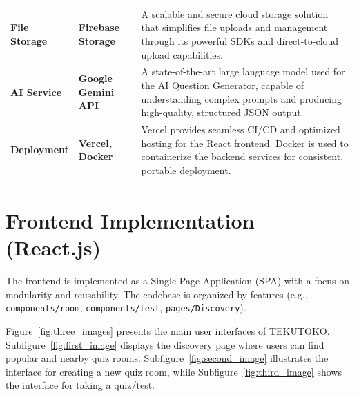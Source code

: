 \begin{longtable}{
>{\raggedright\arraybackslash}p{2.8cm} 
>{\centering\arraybackslash}p{3.2cm} 
>{\raggedright\arraybackslash}p{8cm}}
\textbf{File Storage} & \textbf{Firebase Storage} &
A scalable and secure cloud storage solution that simplifies file uploads and management through its powerful SDKs and direct-to-cloud upload capabilities. \\[0.5em]

\textbf{AI Service} & \textbf{Google Gemini API} &
A state-of-the-art large language model used for the AI Question Generator, capable of understanding complex prompts and producing high-quality, structured JSON output. \\[0.5em]

\textbf{Deployment} & \textbf{Vercel, Docker} &
Vercel provides seamless CI/CD and optimized hosting for the React frontend.
Docker is used to containerize the backend services for consistent, portable deployment. \\[0.5em]

\end{longtable}



\section{Frontend Implementation (React.js)}
\label{sec:impl-frontend}

The frontend is implemented as a Single-Page Application (SPA) with a focus on modularity and reusability. The codebase is organized by features (e.g., \texttt{components/room}, \texttt{components/test}, \texttt{pages/Discovery}).  

Figure~\ref{fig:three_images} presents the main user interfaces of TEKUTOKO. Subfigure~\ref{fig:first_image} displays the discovery page where users can find popular and nearby quiz rooms. Subfigure~\ref{fig:second_image} illustrates the interface for creating a new quiz room, while Subfigure~\ref{fig:third_image} shows the interface for taking a quiz/test.

